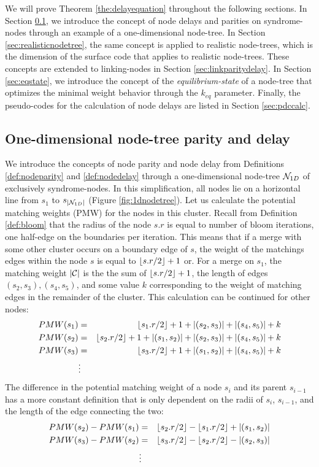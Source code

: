 We will prove Theorem \ref{the:delayequation} throughout the following sections. In Section \ref{sec:1dnodetree}, we introduce the concept of node delays and parities on syndrome-nodes through an example of a one-dimensional node-tree. In Section \ref{sec:realisticnodetree}, the same concept is applied to realistic node-trees, which is the dimension of the surface code that applies to realistic node-trees. These concepts are extended to linking-nodes in Section \ref{sec:linkparitydelay}. In Section \ref{sec:eqstate}, we introduce the concept of the \emph{equilibrium-state} of a node-tree that optimizes the minimal weight behavior through the $k_{eq}$ parameter. Finally, the pseudo-codes for the calculation of node delays are listed in Section \ref{sec:pdccalc}.

\subsection{One-dimensional node-tree parity and delay}\label{sec:1dnodetree}

We introduce the concepts of node parity and node delay from Definitions \ref{def:nodeparity} and \ref{def:nodedelay} through a one-dimensional node-tree $\mathcal{N}_{1D}$ of exclusively syndrome-nodes. In this simplification, all nodes lie on a horizontal line from $s_1$ to $s_{|\mathcal{N}_{1D}|}$ (Figure \ref{fig:1dnodetree}). Let us calculate the potential matching weights (PMW) for the nodes in this cluster. Recall from Definition \ref{def:bloom} that the radius of the node $s.r$ is equal to number of bloom iterations, one half-edge on the boundaries per iteration. This means that if a merge with some other cluster occurs on a boundary edge of $s$, the weight of the matchings edges within the node $s$ is equal to ${\left \lfloor s.r/2 \right \rfloor }+1$ or. For a merge on $s_1$, the matching weight $|\mathcal{C}|$ is the the sum of ${\left \lfloor s.r/2 \right \rfloor }+1$, the length of edges $(s_2,s_3), (s_4,s_5)$, and some value $k$ corresponding to the weight of matching edges in the remainder of the cluster. This calculation can be continued for other nodes:
\begin{eqnarray*}
  PMW(s_1) &=& {\left \lfloor s_1.r/2 \right \rfloor }+1 + \abs{(s_2,s_3)} + \abs{(s_4,s_5)} + k \\
  PMW(s_2) &=& {\left \lfloor s_2.r/2 \right \rfloor }+1 + \abs{(s_1,s_2)} + \abs{(s_2,s_3)} + \abs{(s_4,s_5)} + k \\
  PMW(s_3) &=& {\left \lfloor s_3.r/2 \right \rfloor }+1 + \abs{(s_1,s_2)} + \abs{(s_4,s_5)} + k\\
  &\vdots&
\end{eqnarray*}
The difference in the potential matching weight of a node $s_i$ and its parent $s_{i-1}$ has a more constant definition that is only dependent on the radii of $s_i$,  $s_{i-1}$, and the length of the edge connecting the two:
\begin{eqnarray*}
  PMW(s_2) - PMW(s_1) &=& {\left \lfloor s_2.r/2 \right \rfloor } - {\left \lfloor s_1.r/2 \right \rfloor } + \abs{(s_1,s_2)} \\
  PMW(s_3) - PMW(s_2) &=& {\left \lfloor s_3.r/2 \right \rfloor } - {\left \lfloor s_2.r/2 \right \rfloor } - \abs{(s_2,s_3)} \\
  &\vdots&
\end{eqnarray*}

